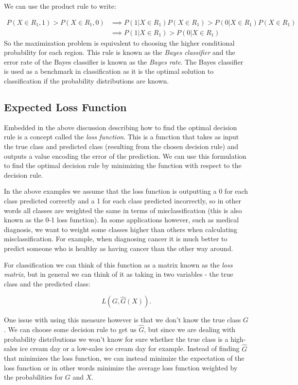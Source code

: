  We can use the product rule to write:
 
 \begin{equation}
 \begin{split}
 P(X\in R_1, 1) >  P(X\in R_1, 0)  & \implies  P(1|X\in R_1) P(X \in R_1) > P(0|X\in R_1) P(X \in R_1) \\
 & \implies  P(1|X\in R_1) > P(0|X\in R_1) 
 \end{split}
 \end{equation}
 So the maximization problem is equivalent to choosing the higher conditional probability for each region. This rule is known as the \emph{Bayes classifier} and the error rate of the Bayes classifier is known as the \emph{Bayes rate}. The Bayes classifier is used as a benchmark in classification as it is the optimal solution to classification if the probability distributions are known.
 
\subsection{Expected Loss Function}
Embedded in the above discussion describing how to find the optimal decision rule is a concept called the \emph{loss function}. This is a function that takes as input the true class and predicted class (resulting from the chosen decision rule) and outputs a value encoding the error of the prediction. We can use this formulation to find the optimal decision rule by minimizing the function with respect to the decision rule.

In the above examples we assume that the loss function is outputting a 0 for each class predicted correctly and a 1 for each class predicted incorrectly, so in other words all classes are weighted the same in terms of misclassification (this is also known as the 0-1 loss function). In some applications however, such as medical diagnosis, we want to weight some classes higher than others when calculating misclassification. For example, when diagnosing cancer it is much better to predict someone who is healthy as having cancer than the other way around.

For classification we can think of this function as a matrix known as the \emph{loss matrix}, but in general we can think of it as taking in two variables - the true class and the predicted class:

\begin{equation}
L(G, \hat{G}(X)).
\end{equation}

One issue with using this measure however is that we don't know the true class $G$. We can choose some decision rule to get us $\hat{G}$, but since we are dealing with probability distributions we won't know for sure whether the true class is a high-sales ice cream day or a low-sales ice cream day for example. Instead of finding $\hat{G}$ that minimizes the loss function, we can instead minimize the expectation of the loss function or in other words minimize the average loss function weighted by the probabilities for $G$ and $X$.


